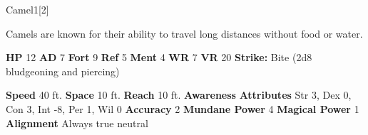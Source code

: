   \begin{monsection}{Camel}{1}[2]
    \vspace{-1em}\vspace{-1em}
    \vspace{0em}

    
      Camels are known for their ability to travel long distances without food or water.
    
    

    \begin{spellcontent}
      \begin{spelltargetinginfo}
        \pari \textbf{HP} 12 \monsep
          \textbf{AD} 7 \monsep
          \textbf{Fort} 9 \monsep
          \textbf{Ref} 5 \monsep
          \textbf{Ment} 4
        \pari \textbf{WR} 7 \monsep
        \textbf{VR} 20
        \pari \textbf{Strike:}
            Bite  (2d8 bludgeoning and piercing)
      \end{spelltargetinginfo}
    \end{spellcontent}
    \begin{monsterfooter}
      \pari \textbf{Speed} 40 ft. \monsep
        \textbf{Space} 10 ft. \monsep
        \textbf{Reach} 10 ft.
      \pari \textbf{Awareness} 
      \pari \textbf{Attributes}
        Str 3, Dex 0,
        Con 3, Int -8,
        Per 1, Wil 0
      \pari \textbf{Accuracy} 2 \monsep
        \textbf{Mundane Power} 4 \monsep
      \textbf{Magical Power} 1
      \pari \textbf{Alignment} Always true neutral
    \end{monsterfooter}
  \end{monsection}
  
